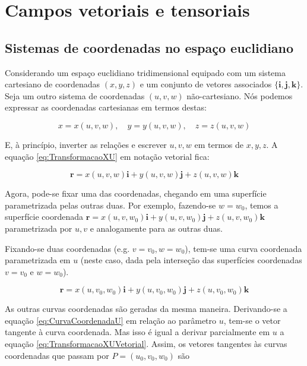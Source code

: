 \chapter{Campos vetoriais e tensoriais}\label{cap:CamposVetoriaisETensoriais}
\section{Sistemas de coordenadas no espaço euclidiano}\label{sec:SistemasCoordenadasEspacoEuclidiano}
Considerando um espaço euclidiano tridimensional equipado com um sistema cartesiano de coordenadas $ (x,y,z) $ e um conjunto de vetores associados $ \{\mathbf{i}, \mathbf{j}, \mathbf{k}\} $. Seja um outro sistema de coordenadas $ (u,v,w) $ não-cartesiano. Nós podemos expressar as coordenadas cartesianas em termos destas:

\begin{equation}\label{eq:TransformacaoXU}
	x=x(u, v, w), \quad y=y(u, v, w), \quad z=z(u, v, w)
\end{equation}
	
E, à princípio, inverter as relações e escrever $ u,v,w $ em termos de $ x,y,z $. A equação \eqref{eq:TransformacaoXU} em notação vetorial fica:

\begin{equation}\label{eq:TransformacaoXUVetorial}
\mathbf{r}=x(u, v, w) \mathbf{i}+y(u, v, w) \mathbf{j}+z(u, v, w) \mathbf{k}
\end{equation}

Agora, pode-se fixar uma das coordenadas, chegando em uma superfície parametrizada pelas outras duas. Por exemplo, fazendo-se $ w=w_0 $, temos a superfície coordenada $ \mathbf{r}=x\left(u, v, w_{0}\right) \mathbf{i}+y\left(u, v, w_{0}\right) \mathbf{j}+z\left(u, v, w_{0}\right) \mathbf{k} $ parametrizada por $ u,v $ e analogamente para as outras duas.

Fixando-se duas coordenadas (e.g. $ v=v_0,w=w_0 $), tem-se uma curva coordenada parametrizada em $ u $ (neste caso, dada pela interseção das superfícies coordenadas $ v=v_0 $ e $ w=w_0 $).

\begin{equation}\label{eq:CurvaCoordenadaU}
 \mathbf{r}=x\left(u, v_{0}, w_{0}\right) \mathbf{i}+y\left(u, v_{0}, w_{0}\right) \mathbf{j}+z\left(u, v_{0}, w_{0}\right) \mathbf{k} 
\end{equation}

As outras curvas coordenadas são geradas da mesma maneira. Derivando-se a equação \eqref{eq:CurvaCoordenadaU} em relação ao parâmetro $ u $, tem-se o vetor tangente à curva coordenada. Mas isso é igual a derivar parcialmente em $ u $ a equação \eqref{eq:TransformacaoXUVetorial}. Assim, os vetores tangentes às curvas coordenadas que passam por $ P=(u_0,v_0,w_0) $ são


